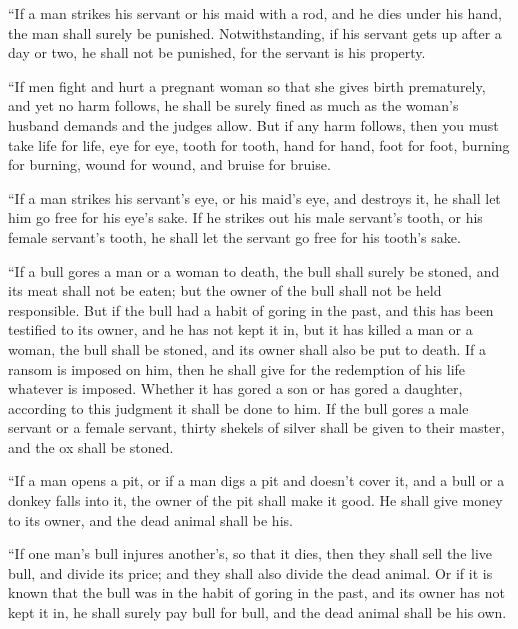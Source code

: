 {\par }{\PP {}“If a man strikes his servant or his maid with a rod, and he dies under his hand, the man shall surely be punished.
Notwithstanding, if his servant gets up after a day or two, he shall not be punished, for the servant is his property.
\par }{\PP {}“If men fight and hurt a pregnant woman so that she gives birth prematurely, and yet no harm follows, he shall be surely fined as much as the woman’s husband demands and the judges allow.
But if any harm follows, then you must take life for life,
eye for eye, tooth for tooth, hand for hand, foot for foot,
burning for burning, wound for wound, and bruise for bruise.
\par }{\PP {}“If a man strikes his servant’s eye, or his maid’s eye, and destroys it, he shall let him go free for his eye’s sake.
If he strikes out his male servant’s tooth, or his female servant’s tooth, he shall let the servant go free for his tooth’s sake.
\par }{\PP {}“If a bull gores a man or a woman to death, the bull shall surely be stoned, and its meat shall not be eaten; but the owner of the bull shall not be held responsible.
But if the bull had a habit of goring in the past, and this has been testified to its owner, and he has not kept it in, but it has killed a man or a woman, the bull shall be stoned, and its owner shall also be put to death.
If a ransom is imposed on him, then he shall give for the redemption of his life whatever is imposed.
Whether it has gored a son or has gored a daughter, according to this judgment it shall be done to him.
If the bull gores a male servant or a female servant, thirty shekels of silver shall be given to their master, and the ox shall be stoned.
\par }{\PP {}“If a man opens a pit, or if a man digs a pit and doesn’t cover it, and a bull or a donkey falls into it,
the owner of the pit shall make it good. He shall give money to its owner, and the dead animal shall be his.
\par }{\PP {}“If one man’s bull injures another’s, so that it dies, then they shall sell the live bull, and divide its price; and they shall also divide the dead animal.
Or if it is known that the bull was in the habit of goring in the past, and its owner has not kept it in, he shall surely pay bull for bull, and the dead animal shall be his own.

}
